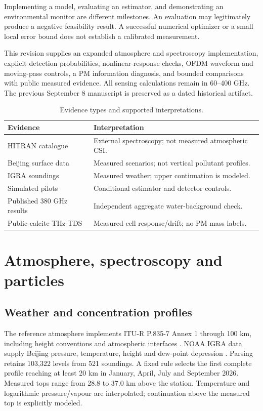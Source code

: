 \documentclass[conference]{IEEEtran}
\begin{document}
Implementing a model, evaluating an estimator, and demonstrating an environmental monitor are different milestones. An evaluation may legitimately produce a negative feasibility result. A successful numerical optimizer or a small local error bound does not establish a calibrated measurement.

This revision supplies an expanded atmosphere and spectroscopy implementation, explicit detection probabilities, nonlinear-response checks, OFDM waveform and moving-pass controls, a PM information diagnosis, and bounded comparisons with public measured evidence. All sensing calculations remain in 60--400 GHz. The previous September 8 manuscript is preserved as a dated historical artifact.

\begin{table}[t]\centering\footnotesize
\caption{Evidence types and supported interpretations.}
\begin{tabular}{p{}p{}}\toprule
Evidence & Interpretation\\\midrule
HITRAN catalogue & External spectroscopy; not measured atmospheric CSI.\\
Beijing surface data & Measured scenarios; not vertical pollutant profiles.\\
IGRA soundings & Measured weather; upper continuation is modeled.\\
Simulated pilots & Conditional estimator and detector controls.\\
Published 380 GHz results & Independent aggregate water-background check.\\
Public calcite THz-TDS & Measured cell response/drift; no PM mass labels.\\\bottomrule
\end{tabular}\label{tab:evidence}
\end{table}

\section{Atmosphere, spectroscopy and particles}
\subsection{Weather and concentration profiles}
The reference atmosphere implements ITU-R P.835-7 Annex 1 through 100 km, including height conventions and atmospheric interfaces \cite{itu835}. NOAA IGRA data supply Beijing pressure, temperature, height and dew-point depression \cite{igra}. Parsing retains 103,322 levels from 521 soundings. A fixed rule selects the first complete profile reaching at least 20 km in January, April, July and September 2026. Measured tops range from 28.8 to 37.0 km above the station. Temperature and logarithmic pressure/vapour are interpolated; continuation above the measured top is explicitly modeled.
\end{document}
